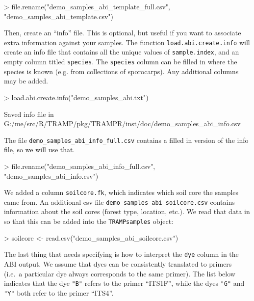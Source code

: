\documentclass[a4paper]{article}
\newcommand\code\texttt
\begin{document}
\begin{Schunk}
\begin{Sinput}
> file.rename("demo_samples_abi_template_full.csv", "demo_samples_abi_template.csv")
\end{Sinput}
\end{Schunk}

Then, create an ``info'' file.  This is optional, but useful if you
want to associate extra information against your samples.  The
function \code{load.abi.create.info} will create an info file that
contains all the unique values of \code{sample.index}, and an empty
column titled \code{species}.  The \code{species} column can be filled
in where the species is known (e.g. from collections of sporocarps).
Any additional columns may be added.

\begin{Schunk}
\begin{Sinput}
> load.abi.create.info("demo_samples_abi.txt")
\end{Sinput}
\begin{Soutput}
Saved info file in G:/me/src/R/TRAMP/pkg/TRAMPR/inst/doc/demo_samples_abi_info.csv
\end{Soutput}
\end{Schunk}

The file \code{demo\_samples\_abi\_info\_full.csv} contains a filled
in version of the info file, so we will use that.

\begin{Schunk}
\begin{Sinput}
> file.rename("demo_samples_abi_info_full.csv", "demo_samples_abi_info.csv")
\end{Sinput}
\end{Schunk}

We added a column \code{soilcore.fk}, which indicates which soil core
the samples came from.  An additional csv file
\code{demo\_samples\_abi\_soilcore.csv} contains information about
the soil cores (forest type, location, etc.).  We read that data in so
that this can be added into the \code{TRAMPsamples} object:

\begin{Schunk}
\begin{Sinput}
> soilcore <- read.csv("demo_samples_abi_soilcore.csv")
\end{Sinput}
\end{Schunk}

The last thing that needs specifying is how to interpret the
\code{dye} column in the ABI output.  We assume that dyes can be
consistently translated to primers (i.e.\ a particular dye always
corresponds to the same primer).  The list below indicates that the
dye \code{"B"} refers to the primer ``ITS1F'', while the dyes
\code{"G"} and \code{"Y"} both refer to the primer ``ITS4''.
\end{document}
